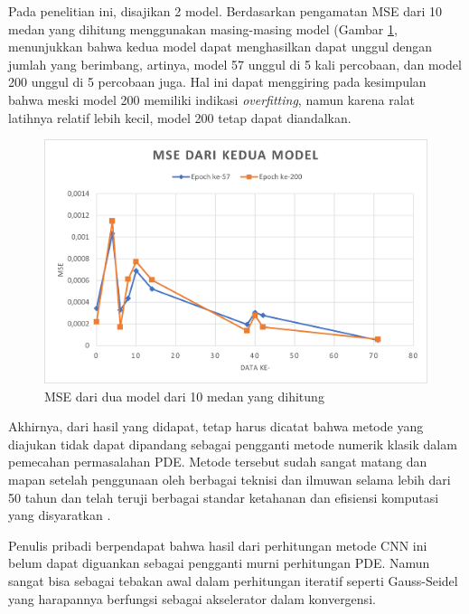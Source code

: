 Pada penelitian ini, disajikan 2 model. Berdasarkan pengamatan MSE dari 10 medan yang dihitung menggunakan masing-masing model (Gambar \ref{mse2model}, menunjukkan bahwa kedua model dapat menghasilkan dapat unggul dengan jumlah yang berimbang, artinya, model 57 unggul di 5 kali percobaan, dan model 200 unggul di 5 percobaan juga. Hal ini dapat menggiring pada kesimpulan bahwa meski model 200 memiliki indikasi \textit{overfitting}, namun karena ralat latihnya relatif lebih kecil, model 200 tetap dapat diandalkan. 
\begin{figure}[h!]
    \centering
    \includegraphics[width=12cm]{gambar/mse dari dua model.png}
    \caption{MSE dari dua model dari 10 medan yang dihitung}
    \label{mse2model}
\end{figure}

Akhirnya, dari hasil yang didapat, tetap harus dicatat bahwa metode yang diajukan tidak dapat dipandang sebagai pengganti metode numerik klasik dalam pemecahan permasalahan PDE. Metode tersebut sudah sangat matang dan mapan setelah penggunaan oleh berbagai teknisi dan ilmuwan selama lebih dari 50 tahun dan telah teruji berbagai standar ketahanan dan efisiensi komputasi yang disyaratkan \citep{DBLP:journals/corr/abs-1711-10561}.

Penulis pribadi berpendapat bahwa hasil dari perhitungan metode CNN ini belum dapat diguankan sebagai pengganti murni perhitungan PDE. Namun sangat bisa sebagai tebakan awal dalam perhitungan iteratif seperti Gauss-Seidel yang harapannya berfungsi sebagai akselerator dalam konvergensi.
